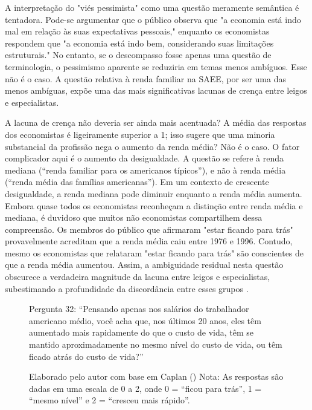A interpretação do "viés pessimista" como uma questão meramente semântica é tentadora. Pode-se argumentar que o público observa que "a economia está indo mal em relação às suas expectativas pessoais," enquanto os economistas respondem que "a economia está indo bem, considerando suas limitações estruturais." No entanto, se o descompasso fosse apenas uma questão de terminologia, o pessimismo aparente se reduziria em temas menos ambíguos. Esse não é o caso. A questão relativa à renda familiar na SAEE, por ser uma das menos ambíguas, expõe uma das mais significativas lacunas de crença entre leigos e especialistas.

A lacuna de crença não deveria ser ainda mais acentuada? A média das respostas dos economistas é ligeiramente superior a 1; isso sugere que uma minoria substancial da profissão nega o aumento da renda média? Não é o caso. O fator complicador aqui é o aumento da desigualdade. A questão se refere à renda mediana (“renda familiar para os americanos típicos”), e não à renda média (“renda média das famílias americanas”). Em um contexto de crescente desigualdade, a renda mediana pode diminuir enquanto a renda média aumenta. Embora quase todos os economistas reconheçam a distinção entre renda média e mediana, é duvidoso que muitos não economistas compartilhem dessa compreensão. Os membros do público que afirmaram "estar ficando para trás" provavelmente acreditam que a renda média caiu entre 1976 e 1996. Contudo, mesmo os economistas que relataram "estar ficando para trás" são conscientes de que a renda média aumentou. Assim, a ambiguidade residual nesta questão obscurece a verdadeira magnitude da lacuna entre leigos e especialistas, subestimando a profundidade da discordância entre esses grupos \cite{The_Myth_of_the_Rational_Voter}.


\begin{figure}[H]
    \centering
    \caption*{Pergunta 32: “Pensando apenas nos salários do trabalhador americano médio, você acha que, nos últimos 20 anos, eles têm aumentado mais rapidamente do que o custo de vida, têm se mantido aproximadamente no mesmo nível do custo de vida, ou têm ficado atrás do custo de vida?”}
    \caption{Elaborado pelo autor com base em Caplan (\citeyear{The_Myth_of_the_Rational_Voter}) \newline
    Nota: As respostas são dadas em uma escala de 0 a 2, onde 0 = “ficou para trás”, 1 = “mesmo nível” e 2 = “cresceu mais rápido”.}
    \label{fig:pergunta_32}
\end{figure}

